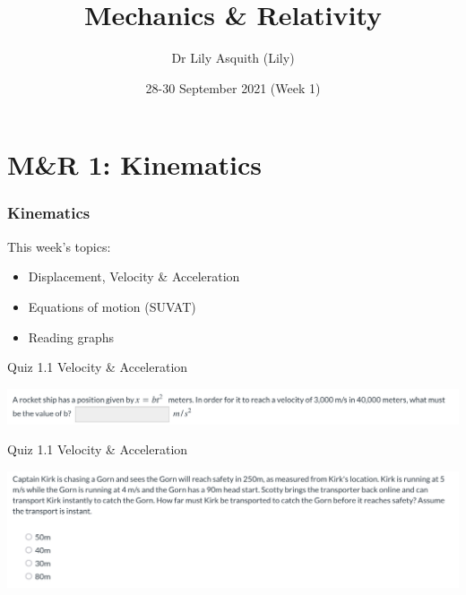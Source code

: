 


% 
\title[ Mechanics \& Relativity]{Mechanics \& Relativity}
\author[Dr Lily Asquith (Lily)]{ Dr Lily Asquith (Lily)}
\date[28-30 September 2021]{28-30 September 2021 (Week 1)}





\begin{frame}
\titlepage
\end{frame} 

\section{M\&R 1: Kinematics}
\begin{frame}
\frametitle{Kinematics} 
\normalsize

This week's topics:\\[3ex]

\begin{itemize}
\item[1.1] Displacement, Velocity \& Acceleration\\[3ex]
\item[1.2] Equations of motion (SUVAT)\\[3ex]
\item[1.3] Reading graphs\\[3ex]
\end{itemize}
\end{frame} 
 
\begin{frame}{Quiz 1.1 Velocity \& Acceleration}

\includegraphics[scale=0.35]{rocket_question}
\vspace{6cm}
\end{frame}

\begin{frame}{Quiz 1.1 Velocity \& Acceleration}

\includegraphics[scale=0.35]{kirk}
\vspace{6cm}
\end{frame}

